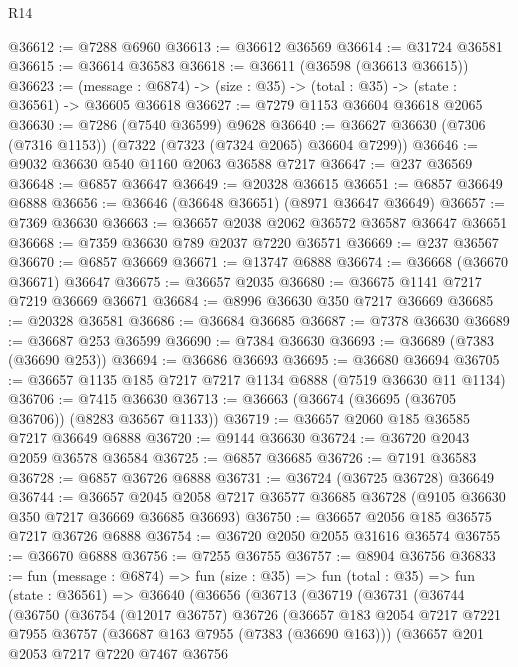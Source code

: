 \begin{lexlean}{R14}
\begin{coremodule}
@36612 := @7288 @6960
@36613 := @36612 @36569
@36614 := @31724 @36581
@36615 := @36614 @36583
@36618 := @36611 (@36598 (@36613 @36615))
@36623 := (message : @6874) -> (size : @35) -> (total : @35) -> (state : @36561) -> @36605 @36618
@36627 := @7279 @1153 @36604 @36618 @2065
@36630 := @7286 (@7540 @36599) @9628
@36640 := @36627 @36630 (@7306 (@7316 @1153)) (@7322 (@7323 (@7324 @2065) @36604 @7299))
@36646 := @9032 @36630 @540 @1160 @2063 @36588 @7217
@36647 := @237 @36569
@36648 := @6857 @36647
@36649 := @20328 @36615
@36651 := @6857 @36649 @6888
@36656 := @36646 (@36648 @36651) (@8971 @36647 @36649)
@36657 := @7369 @36630
@36663 := @36657 @2038 @2062 @36572 @36587 @36647 @36651
@36668 := @7359 @36630 @789 @2037 @7220 @36571
@36669 := @237 @36567
@36670 := @6857 @36669
@36671 := @13747 @6888
@36674 := @36668 (@36670 @36671) @36647
@36675 := @36657 @2035
@36680 := @36675 @1141 @7217 @7219 @36669 @36671
@36684 := @8996 @36630 @350 @7217 @36669
@36685 := @20328 @36581
@36686 := @36684 @36685
@36687 := @7378 @36630
@36689 := @36687 @253 @36599
@36690 := @7384 @36630
@36693 := @36689 (@7383 (@36690 @253))
@36694 := @36686 @36693
@36695 := @36680 @36694
@36705 := @36657 @1135 @185 @7217 @7217 @1134 @6888 (@7519 @36630 @11 @1134)
@36706 := @7415 @36630
@36713 := @36663 (@36674 (@36695 (@36705 @36706)) (@8283 @36567 @1133))
@36719 := @36657 @2060 @185 @36585 @7217 @36649 @6888
@36720 := @9144 @36630
@36724 := @36720 @2043 @2059 @36578 @36584
@36725 := @6857 @36685
@36726 := @7191 @36583
@36728 := @6857 @36726 @6888
@36731 := @36724 (@36725 @36728) @36649
@36744 := @36657
    @2045
    @2058
    @7217
    @36577
    @36685
    @36728
    (@9105 @36630 @350 @7217 @36669 @36685 @36693)
@36750 := @36657 @2056 @185 @36575 @7217 @36726 @6888
@36754 := @36720 @2050 @2055 @31616 @36574
@36755 := @36670 @6888
@36756 := @7255 @36755
@36757 := @8904 @36756
@36833 := fun (message : @6874) =>
  fun (size : @35) =>
  fun (total : @35) =>
  fun (state : @36561) =>
  @36640
    (@36656
      (@36713
        (@36719
          (@36731
            (@36744
              (@36750
                (@36754
                  (@12017 @36757)
                  @36726
                  (@36657
                    @183
                    @2054
                    @7217
                    @7221
                    @7955
                    @36757
                    (@36687 @163 @7955 (@7383 (@36690 @163)))
                    (@36657
                      @201
                      @2053
                      @7217
                      @7220
                      @7467
                      @36756

\end{coremodule}
\end{lexlean}
